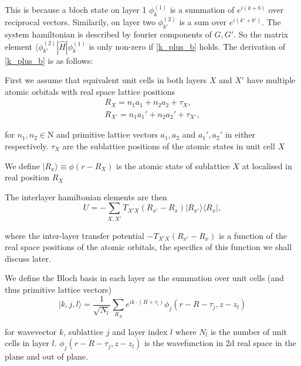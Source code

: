 \documentclass[12pt]{report} %
\begin{document}
  This is because a bloch state on layer 1 $\phi_k^{(1)}$ is a summation of $e^{i(k+b)}$ over reciprocal vectors. Similarily, on layer two $\phi_{k'}^{(2)}$ is a sum over $e^{i(k'+b')}$. The system hamiltonian is described by fourier components of $G, G'$. So the matrix element $\langle \phi_{k'}^{(2)} | \hat{H} | \phi_{k}^{(1)}$ is only non-zero if \ref{k_plus_b} holds. The derivation of \ref{k_plus_b} is as follows:

  First we assume that equivalent unit cells in both layers $X$ and $X'$ have multiple atomic orbitals with real space lattice positions
  \begin{equation}
    \begin{gathered}
    R_X = n_1 a_1 + n_2 a_2 + \tau_X,\\
    R_{X'} = n_1 a_1' + n_2 a_2' + \tau_{X'},
    \end{gathered}
    \label{inter-layer_real_sublattice_positions}
  \end{equation}

  for $n_1, n_2 \in \mathrm{N}$ and primitive lattice vectors $a_1, a_2$ and $a_1', a_2'$ in either respectively. $\tau_X$ are the sublattice positions of the atomic states in unit cell $X$

  We define $| R_x \rangle \equiv \phi(r - R_X)$ is the atomic state of sublattice $X$ at localised in real position $R_X$

  The interlayer hamiltonian elements are then
  \begin{equation}
    U = -\sum_{X, X'} T_{X'X}(R_{x'} - R_x) |R_{x'}\rangle \langle R_x|,
    \label{inter-layer_hamiltonian_elements}
  \end{equation}

  where the inter-layer transfer potential $-T_{X'X}(R_{x'} - R_x)$ is a function of the real space positions of the atomic orbitals, the specifics of this function we shall discuss later.

  We define the Bloch basis in each layer as the summation over unit cells (and thus primitive lattice vectors)
  \begin{equation}
    | k,j,l \rangle = \frac{1}{\sqrt{N_l}}\sum_{R_X}e^{ik\cdot(R+\tau_i)}\phi_j(r-R-\tau_j, z-z_l)
    \label{inter-layer_real_bloch_basis}
  \end{equation}

  for wavevector $k$, sublattice $j$ and layer index $l$ where $N_l$ is the number of unit cells in layer $l$. $\phi_j (r - R - \tau_j, z-z_l)$ is the wavefunction in 2d real space in the plane and out of plane.
\end{document}
